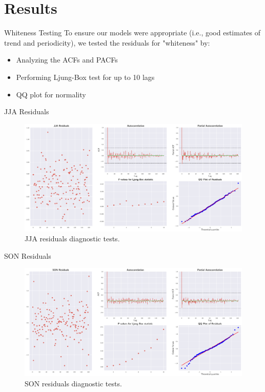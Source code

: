\documentclass[10pt]{beamer}
\begin{document}
\section{Results}
\begin{frame}{Whiteness Testing}
To ensure our models were appropriate  (i.e., good estimates of  trend and periodicity), we tested the residuals for "whiteness" by:
  \begin{itemize}
    \item Analyzing the ACFs and PACFs
    \item Performing Ljung-Box test for up to 10 lags
    \item QQ plot for normality
\end{itemize}
\end{frame}

\begin{frame}{JJA Residuals}
	\begin{figure}[htbp]
		\includegraphics[scale=0.225,left]{jja_res}
		\caption{JJA residuals diagnostic tests.}
	\end{figure}
\end{frame}

\begin{frame}{SON Residuals}
	\begin{figure}[htbp]
		\includegraphics[scale=0.225,left]{son_res}
		\caption{SON residuals diagnostic tests.}
	\end{figure}
\end{frame}
\end{document}
